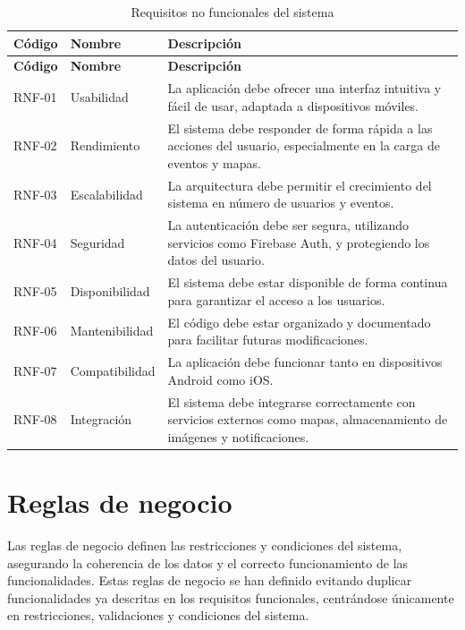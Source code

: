 {\renewcommand{\arraystretch}{1.18}
\begin{longtable}{@{}>{\raggedright\arraybackslash}p{} >{\raggedright\arraybackslash}p{} >{\raggedright\arraybackslash}p{}@{}}
\caption{Requisitos no funcionales del sistema}
\label{tab:requisitos_no_funcionales}\\
\toprule
\textbf{Código} & \textbf{Nombre} & \textbf{Descripción} \\
\midrule
\endfirsthead
\toprule
\textbf{Código} & \textbf{Nombre} & \textbf{Descripción} \\
\midrule
\endhead
\bottomrule
\endfoot
RNF-01 & Usabilidad & La aplicación debe ofrecer una interfaz intuitiva y fácil de usar, adaptada a dispositivos móviles. \\
RNF-02 & Rendimiento & El sistema debe responder de forma rápida a las acciones del usuario, especialmente en la carga de eventos y mapas. \\
RNF-03 & Escalabilidad & La arquitectura debe permitir el crecimiento del sistema en número de usuarios y eventos. \\
RNF-04 & Seguridad & La autenticación debe ser segura, utilizando servicios como Firebase Auth, y protegiendo los datos del usuario. \\
RNF-05 & Disponibilidad & El sistema debe estar disponible de forma continua para garantizar el acceso a los usuarios. \\
RNF-06 & Mantenibilidad & El código debe estar organizado y documentado para facilitar futuras modificaciones. \\
RNF-07 & Compatibilidad & La aplicación debe funcionar tanto en dispositivos Android como iOS. \\
RNF-08 & Integración & El sistema debe integrarse correctamente con servicios externos como mapas, almacenamiento de imágenes y notificaciones. \\
\end{longtable}
}

\section{Reglas de negocio}

Las reglas de negocio definen las restricciones y condiciones del sistema, asegurando la coherencia de los datos y el correcto funcionamiento de las funcionalidades. Estas reglas de negocio se han definido evitando duplicar funcionalidades ya descritas en los requisitos funcionales, centrándose únicamente en restricciones, validaciones y condiciones del sistema.

